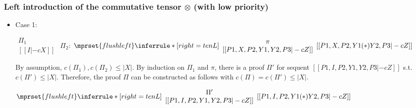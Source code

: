 \subsubsection{Left introduction of the commutative tensor $\otimes$ (with low priority)}
\begin{itemize}
\item Case 1:
      \begin{center}
        \scriptsize
        \begin{math}
          \begin{array}{c}
            \Pi_1 \\
            {[[I |-c X]]}
          \end{array}
        \end{math}
        \qquad\qquad
        $\Pi_2$:
        \begin{math}
          $$\mprset{flushleft}
          \inferrule* [right={\tiny tenL}] {
            {
              \begin{array}{c}
                \pi \\
                {[[P1, X, P2, Y1, Y2, P3 |-c Z]]}
              \end{array}
            }
          }{[[P1, X, P2, Y1 (*) Y2, P3 |-c Z]]}
        \end{math}
      \end{center}
      By assumption, $c(\Pi_1),c(\Pi_2)\leq |X|$. By induction on $\Pi_1$
      and $\pi$, there is a proof $\Pi'$ for sequent
      $[[P1, I, P2, Y1, Y2, P3 |-c Z]]$ s.t. $c(\Pi') \leq |X|$. Therefore,
      the proof $\Pi$ can be constructed as follows with
      $c(\Pi) = c(\Pi') \leq |X|$.
      \begin{center}
        \scriptsize
        \begin{math}
          $$\mprset{flushleft}
          \inferrule* [right={\tiny tenL}] {
            {
              \begin{array}{c}
                \Pi' \\
                {[[P1, I, P2, Y1, Y2, P3 |-c Z]]}
              \end{array}
            }
          }{[[P1, I, P2, Y1 (*) Y2, P3 |-c Z]]}
        \end{math}
      \end{center}


\end{itemize}
